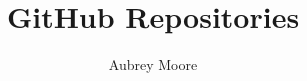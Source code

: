\documentclass{article}
\begin{document}
\title{GitHub Repositories}
\author{Aubrey Moore}
\maketitle
\nocite{*}
\printbibliography
\end{document}
